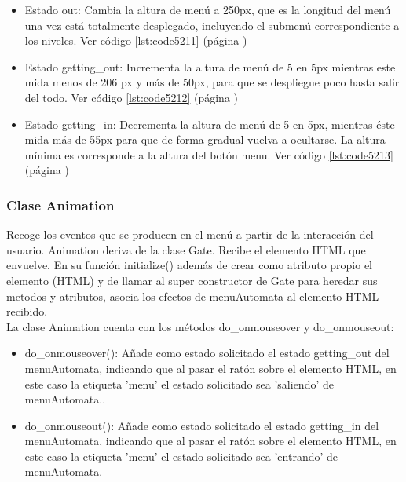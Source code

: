 \begin{itemize}
 \item Estado out: Cambia la altura de menú a 250px, que es la longitud del menú una vez está totalmente desplegado, incluyendo el submenú correspondiente a los 
 niveles. Ver código \ref{lst:code5211} (página \pageref{lst:code5211})

 \item Estado getting\_out: Incrementa la altura de menú de 5 en 5px  mientras este mida menos de 206 px y más de 50px, para que se despliegue poco hasta salir del todo.
 Ver código \ref{lst:code5212} (página \pageref{lst:code5212})

 \item Estado getting\_in: Decrementa la altura de menú de 5 en 5px, mientras éste mida  más de 55px para que de forma gradual vuelva a ocultarse. 
 La altura mínima es corresponde a la altura del botón menu. Ver código \ref{lst:code5213} (página \pageref{lst:code5213})
\end{itemize}


\subsubsection{Clase Animation}
\label{subsubsection:animation}

Recoge los eventos que se producen en el menú a partir de la interacción del usuario. 
Animation deriva de la clase Gate.
Recibe el elemento HTML que envuelve.
En su función initialize() además de crear como atributo propio el elemento (HTML) y de llamar al super constructor de Gate para 
heredar sus metodos y atributos, asocia los efectos de menuAutomata al elemento HTML recibido.\\

La clase Animation cuenta con los métodos do\_onmouseover y do\_onmouseout:
\begin{itemize}
 \item do\_onmouseover(): Añade como estado solicitado el estado getting\_out del menuAutomata, indicando que al pasar el ratón 
 sobre el elemento HTML, en este caso la etiqueta 'menu' el estado solicitado sea 'saliendo' de menuAutomata..

 \item do\_onmouseout(): Añade como estado solicitado el estado getting\_in del menuAutomata, indicando que al pasar el ratón 
 sobre el elemento HTML, en este caso la etiqueta 'menu' el estado solicitado sea 'entrando' de menuAutomata.
\end{itemize}

